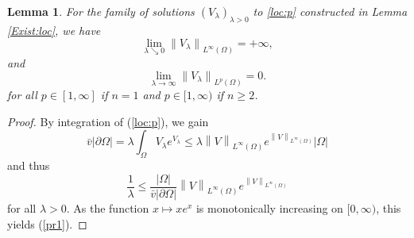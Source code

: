 \documentclass[12pt,a4paper]{amsart}
\newtheorem{lemma}[theorem]{Lemma}
\theoremstyle{definition}
\theoremstyle{remark}
\numberwithin{equation}{section}
\numberwithin{theorem}{section}
\newcommand{\normA}[2][]{\left\lVert #2 \right\rVert_{#1}}
\begin{document}
\begin{lemma}\label{lamlim}
For the family of solutions $(V_\lambda)_{\lambda > 0}$ to \eqref{loc:p} constructed in Lemma \ref{Exist:loc}, we have 
\begin{equation}\label{pr1}
\lim_{\lambda\searrow 0}\normA[L^\infty(\Omega)]{V_\lambda}=+\infty,
\end{equation}
and
\begin{equation}\label{pr2}
\lim_{\lambda\rightarrow \infty}\normA[L^p(\Omega)]{V_\lambda}=0.
\end{equation}
for all $p \in [1,\infty]$ if $n = 1$ and $p \in [1,\infty)$ if $n \geq 2$.
\end{lemma}
\begin{proof} 
By integration of (\ref{loc:p}), we gain 
$$
   \bar{v}|\partial \Omega| = \lambda\int_\Omega V_{\lambda}e^{V_{\lambda}} \leq \lambda \normA[L^\infty(\Omega)]{V} e^{\normA[L^\infty(\Omega)]{V}}|\Omega|
$$
and thus 
$$
  \frac{1}{\lambda} \leq \frac{|\Omega|}{\bar v|\partial \Omega|} \normA[L^\infty(\Omega)]{V} e^{\normA[L^\infty(\Omega)]{V}}
$$
for all $\lambda > 0$. As the function $x \mapsto xe^x$ is monotonically increasing on $[0,\infty)$, this yields (\ref{pr1}).


\end{proof}
\end{document}
